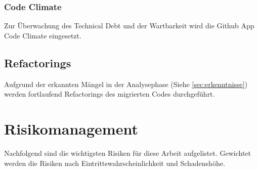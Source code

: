 \documentclass[11pt,a4paper,english,oneside]{book}
\numberwithin{equation}{chapter}
\begin{document}
	\subsubsection{Code Climate}
	Zur Überwachung des Technical Debt und der Wartbarkeit wird die Github App Code Climate \cite{codeclimate} eingesetzt.
	
	\subsection{Refactorings}
	Aufgrund der erkannten Mängel in der Analysephase (Siehe \ref{sec:erkenntnisse}) werden fortlaufend Refactorings des migrierten Codes durchgeführt.
	
	
	
	
	\section{Risikomanagement}
	Nachfolgend sind die wichtigsten Risiken für diese Arbeit aufgelistet. Gewichtet werden die Risiken nach Eintrittswahrscheinlichkeit und Schadenshöhe. \cite{risikomanagement}
	
\end{document}
